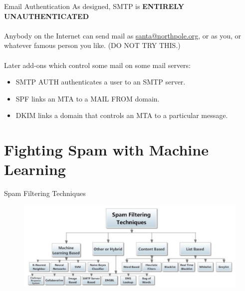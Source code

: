 \documentclass[nobackground,dvipsnames,table]{beamer}
\begin{document}
\begin{frame}{Email Authentication}
    As designed, SMTP is \textbf{ENTIRELY UNAUTHENTICATED}\\~\\
    Anybody on the Internet can send mail as \url{santa@northpole.org}, or as you, or whatever famous person you like. (DO NOT TRY THIS.)\\~\\
    
    Later add-ons which control some mail on some mail servers:
    \begin{itemize}
        \item SMTP AUTH authenticates a user to an SMTP server.
        \item SPF links an MTA to a MAIL FROM domain.
        \item DKIM links a domain that controls an MTA to a particular message.
    \end{itemize}
\end{frame}

\section{Fighting Spam with Machine Learning}

\begin{frame}{Spam Filtering Techniques}
    \begin{figure}
        \centering
        \includegraphics[width=\textwidth]{spam-filtering-techniques}
    \end{figure}
\end{frame}
\end{document}

